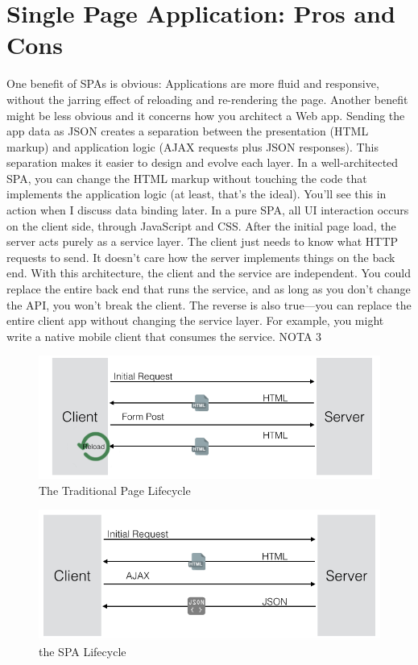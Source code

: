\section{Single Page Application: Pros and Cons}
\label{sec:ARC_overview}

One benefit of SPAs is obvious: Applications are more fluid and responsive, without the jarring effect of reloading and re-rendering the page. Another benefit might be less obvious and it concerns how you architect a Web app. Sending the app data as JSON creates a separation between the presentation (HTML markup) and application logic (AJAX requests plus JSON responses).
This separation makes it easier to design and evolve each layer. In a well-architected SPA, you can change the HTML markup without touching the code that implements the application logic (at least, that’s the ideal). You’ll see this in action when I discuss data binding later.
In a pure SPA, all UI interaction occurs on the client side, through JavaScript and CSS. After the initial page load, the server acts purely as a service layer. The client just needs to know what HTTP requests to send. It doesn’t care how the server implements things on the back end.
With this architecture, the client and the service are independent. You could replace the entire back end that runs the service, and as long as you don’t change the API, you won’t break the client. The reverse is also true—you can replace the entire client app without changing the service layer. For example, you might write a native mobile client that consumes the service. NOTA 3

\begin {figure}[h]
\graphicspath{{images/chapter_arc/}}
\includegraphics[width=\textwidth]{trad_life}
\caption{The Traditional Page Lifecycle}
\end {figure}


\begin {figure}[h]
\graphicspath{{images/chapter_arc/}}
\includegraphics[width=\textwidth]{spa_life}
\caption{the SPA Lifecycle}
\end {figure}



